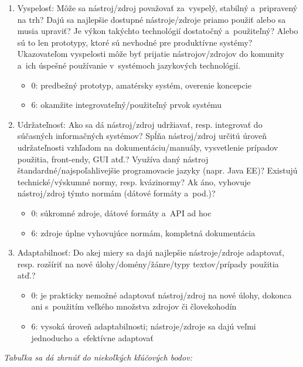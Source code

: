 \begin{multicols}{2}
\begin{enumerate}
\begin{itemize}
\end{itemize}
\item Vyspelosť: Môže sa nástroj/zdroj považovať za~vyspelý, stabilný a~pripravený na trh? Dajú sa najlepšie dostupné nástroje/zdroje priamo použiť alebo sa musia upraviť? Je výkon takýchto technológií dostatočný a~použiteľný? Alebo sú to len prototypy, ktoré sú nevhodné pre produktívne systémy? Ukazovateľom vyspelosti môže byť prijatie nástrojov/zdrojov do komunity a~ich úspešné používanie v~systémoch jazykových technológií.
\begin{itemize}
\item 0: predbežný prototyp, amatérsky systém, overenie koncepcie
\item 6: okamžite integrovateľný/po\-u\-ži\-teľný prvok systému
\end{itemize}
\item Udržateľnosť: Ako sa dá nástroj/zdroj udržiavať, resp. integrovať do súčasných informačných systémov? Spĺňa nástroj/zdroj určitú úroveň udržateľnosti vzhľadom na dokumentáciu/manuály, vysvetlenie prípadov použitia, front-endy, GUI atď.? Využíva daný nástroj štandardné/najspoľahlivejšie programovacie jazyky (napr. Java EE)? Existujú technické/výskumné normy, resp. kvázinormy? Ak áno, vyhovuje nástroj/zdroj týmto normám (dátové formáty a~pod.)?
\begin{itemize}
\item 0: súkromné zdroje, dátové formáty a~API ad hoc
\item 6: zdroje úplne vyhovujúce normám, kompletná dokumentácia
\end{itemize}
\item Adaptabilnosť: Do akej miery sa dajú najlepšie nástroje/zdroje adaptovať, resp. rozšíriť na nové úlohy/domény/žánre/typy textov/prí\-pa\-dy použitia atď.?
\begin{itemize}
\item 0: je prakticky nemožné adaptovať nástroj/zdroj na nové úlohy, dokonca ani s~použitím veľkého množstva zdrojov či človekohodín
\item 6: vysoká úroveň adaptabilnosti; nástroje/zdroje sa dajú veľmi jednoducho a~efektívne adaptovať
\end{itemize}
\end{enumerate}

\emph{Tabuľka sa dá zhrnúť do niekoľkých kľúčových bodov:}


\end{multicols}
